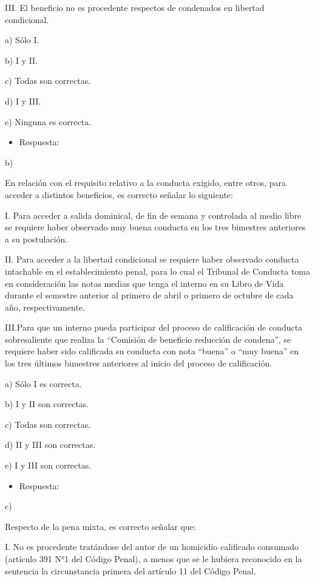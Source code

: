 \documentclass[letterpaper, 11pt]{article}
\begin{document}
III. El beneficio no es procedente respectos de condenados en libertad condicional.

a) Sólo I.

b) I y II.

c) Todas son correctas.

d) I y III.

e) Ninguna es correcta.

\begin{itemize}
\item Respuesta:
\end{itemize}
b)


En relación con el requisito relativo a la conducta exigido, entre otros, para acceder
a distintos beneficios, es correcto señalar lo siguiente:

I. Para acceder a salida dominical, de fin de semana y controlada al medio libre se
requiere haber observado muy buena conducta en los tres bimestres anteriores a
su postulación.

II. Para acceder a la libertad condicional se requiere haber observado conducta
intachable en el establecimiento penal, para lo cual el Tribunal de Conducta toma
en consideración las notas medias que tenga el interno en su Libro de Vida durante
el semestre anterior al primero de abril o primero de octubre de cada año,
respectivamente.

III.Para que un interno pueda participar del proceso de calificación de conducta
sobresaliente que realiza la “Comisión de beneficio reducción de condena”, se
requiere haber sido calificada su conducta con nota “buena” o “muy buena” en los
tres últimos bimestres anteriores al inicio del proceso de calificación.

a) Sólo I es correcta.

b) I y II son correctas.

c) Todas son correctas.

d) II y III son correctas.

e) I y III son correctas.

\begin{itemize}
\item Respuesta:
\end{itemize}
c)


Respecto de la pena mixta, es correcto señalar que:

I. No es procedente tratándose del autor de un homicidio calificado consumado
(artículo 391 N°1 del Código Penal), a menos que se le hubiera reconocido en la
sentencia la circunstancia primera del artículo 11 del Código Penal.
\end{document}
